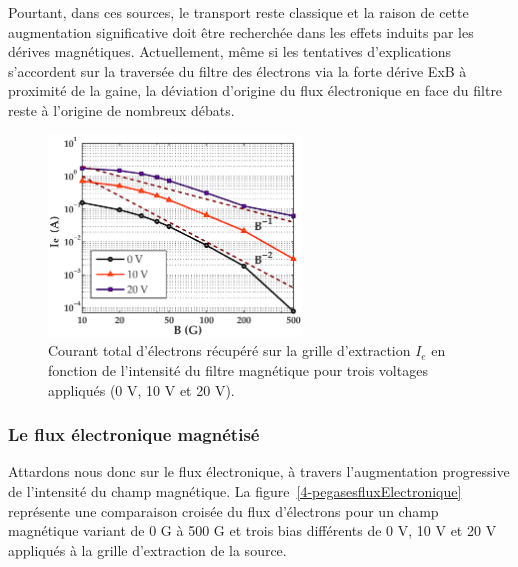 \begin{refsection}
Pourtant, dans ces sources, le transport reste classique et la raison de cette
augmentation significative doit être recherchée dans les effets
induits par les dérives  magnétiques. Actuellement, même si les tentatives d'explications
s'accordent sur la traversée du filtre des électrons via la forte dérive ExB à proximité de la
gaine, la déviation d'origine du flux électronique en face du filtre reste à
l'origine de nombreux débats.

\begin{figure}[!htbp]
	\centering
	\includegraphics[width=0.6\textwidth]{figures/4-pegasesVarMagCourantParoi.eps}
	{\caption{Courant total d'électrons récupéré sur la grille d'extraction $I_e$
	en fonction de l'intensité du filtre magnétique pour trois voltages appliqués (0 V, 10 V et 20 V). }
	\label{pegasesVarMagCourantParoi}}
	\end{figure}

\subsubsection{Le flux électronique magnétisé}

Attardons nous donc sur le flux électronique, à travers l'augmentation
progressive de l'intensité du champ magnétique. La
figure~\ref{4-pegasesfluxElectronique} représente une comparaison croisée du
flux d'électrons pour un champ magnétique variant de 0 G à 500 G et trois bias
différents de 0 V, 10 V et 20 V appliqués à la grille d'extraction de la source. 


\end{refsection}

